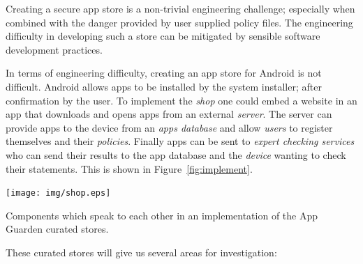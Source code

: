 \documentclass[a4paper]{article}
\begin{document}
Creating a secure app store is a non-trivial engineering challenge; especially
when combined with the danger provided by user supplied policy files. The
engineering difficulty in developing such a store can be mitigated by sensible
software development practices. 

In terms of engineering difficulty, creating an app store for Android is not
difficult.  Android allows apps to be installed by the system installer; after
confirmation by the user.  To implement the \emph{shop} one could embed a
website in an app that downloads and opens apps from an external \emph{server}.
The server can provide apps to the device from an \emph{apps database} and allow
\emph{users} to register themselves and their \emph{policies}.  Finally apps can
be sent to \emph{expert checking services} who can send their results to the app
database and the \emph{device} wanting to check their statements.  This is shown
in Figure~\ref{fig:implement}.

\begin{marginfigure}
  \texttt{[image: img/shop.eps]}
  \caption{Components which speak to each other in an implementation of the App
  Guarden curated stores.}
  \label{fig:implement}
\end{marginfigure}

These curated stores will give us several areas for investigation:
\end{document}
